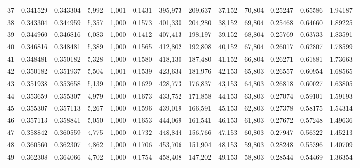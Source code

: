 \begin{tabular}{rrrrrrrrrrrrr}
37  &  0.341529 &  0.343304 &   5,992 &  1,001 &                                     0.1431 &  395,973 &  209,637 &   37,152 &   70,804 &  0.25247 &  0.65586 &  1.94187 \\
38  &  0.343304 &  0.344959 &   5,357 &  1,000 &                                     0.1573 &  401,330 &  204,280 &   38,152 &   69,804 &  0.25468 &  0.64660 &  1.89225 \\
39  &  0.344960 &  0.346816 &   6,083 &  1,000 &                                     0.1412 &  407,413 &  198,197 &   39,152 &   68,804 &  0.25769 &  0.63733 &  1.83591 \\
40  &  0.346816 &  0.348481 &   5,389 &  1,000 &                                     0.1565 &  412,802 &  192,808 &   40,152 &   67,804 &  0.26017 &  0.62807 &  1.78599 \\
41  &  0.348481 &  0.350182 &   5,328 &  1,000 &                                     0.1580 &  418,130 &  187,480 &   41,152 &   66,804 &  0.26271 &  0.61881 &  1.73663 \\
42  &  0.350182 &  0.351937 &   5,504 &  1,001 &                                     0.1539 &  423,634 &  181,976 &   42,153 &   65,803 &  0.26557 &  0.60954 &  1.68565 \\
43  &  0.351938 &  0.353658 &   5,139 &  1,000 &                                     0.1629 &  428,773 &  176,837 &   43,153 &   64,803 &  0.26818 &  0.60027 &  1.63805 \\
44  &  0.353659 &  0.355307 &   4,979 &  1,000 &                                     0.1673 &  433,752 &  171,858 &   44,153 &   63,803 &  0.27074 &  0.59101 &  1.59193 \\
45  &  0.355307 &  0.357113 &   5,267 &  1,000 &                                     0.1596 &  439,019 &  166,591 &   45,153 &   62,803 &  0.27378 &  0.58175 &  1.54314 \\
46  &  0.357113 &  0.358841 &   5,050 &  1,000 &                                     0.1653 &  444,069 &  161,541 &   46,153 &   61,803 &  0.27672 &  0.57248 &  1.49636 \\
47  &  0.358842 &  0.360559 &   4,775 &  1,000 &                                     0.1732 &  448,844 &  156,766 &   47,153 &   60,803 &  0.27947 &  0.56322 &  1.45213 \\
48  &  0.360560 &  0.362307 &   4,862 &  1,000 &                                     0.1706 &  453,706 &  151,904 &   48,153 &   59,803 &  0.28248 &  0.55396 &  1.40709 \\
49  &  0.362308 &  0.364066 &   4,702 &  1,000 &                                     0.1754 &  458,408 &  147,202 &   49,153 &   58,803 &  0.28544 &  0.54469 &  1.36354 \\

\end{tabular}
